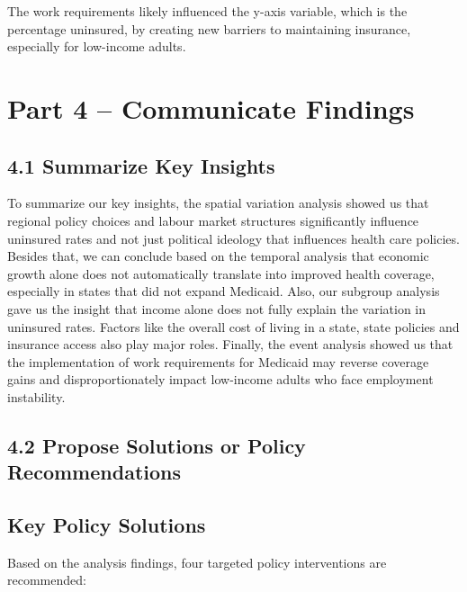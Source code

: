 \documentclass[
]{article}
\begin{document}
The work requirements likely influenced the y-axis variable, which is
the percentage uninsured, by creating new barriers to maintaining
insurance, especially for low-income adults.

\section{Part 4 -- Communicate
Findings}\label{part-4-communicate-findings}

\subsection{4.1 Summarize Key Insights}\label{summarize-key-insights}

To summarize our key insights, the spatial variation analysis showed us
that regional policy choices and labour market structures significantly
influence uninsured rates and not just political ideology that
influences health care policies. Besides that, we can conclude based on
the temporal analysis that economic growth alone does not automatically
translate into improved health coverage, especially in states that did
not expand Medicaid. Also, our subgroup analysis gave us the insight
that income alone does not fully explain the variation in uninsured
rates. Factors like the overall cost of living in a state, state
policies and insurance access also play major roles. Finally, the event
analysis showed us that the implementation of work requirements for
Medicaid may reverse coverage gains and disproportionately impact
low-income adults who face employment instability.

\subsubsection{}\label{section}

\subsection{4.2 Propose Solutions or Policy
Recommendations}\label{propose-solutions-or-policy-recommendations}

\subsection{Key Policy Solutions}\label{key-policy-solutions}

Based on the analysis findings, four targeted policy interventions are
recommended:
\end{document}
